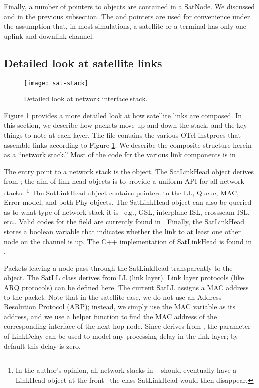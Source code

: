 Finally, a number of pointers to objects are contained in a SatNode.  We
discussed  and  in the previous 
subsection.  The  and  pointers are
used for convenience under the assumption that, in most simulations,
a satellite or a terminal has only one uplink and downlink channel.

\subsection{Detailed look at satellite links}
\begin{figure}
    \centerline{\texttt{[image: sat-stack]}}
    \caption{Detailed look at network interface stack.}
    \label{fig:sat-stack}
\end{figure}

Figure \ref{fig:sat-stack} provides a more detailed look at how satellite links
are composed.  In this section, we describe how packets move up and down
the stack, and the key things to note at each layer.  The file 
 contains the various OTcl instprocs that assemble
links according to Figure \ref{fig:sat-stack}.  We describe the composite
structure herein as a ``network stack.''  Most of the code for the
various link components is in .

The entry point to a network stack is the  object.  The
SatLinkHead object derives from ; the aim of link
head objects is to provide a uniform API for all network stacks.
\footnote{In the author's opinion, all network stacks in \ns~ should 
eventually have a LinkHead object at the front-- the class SatLinkHead 
would then disappear.}  The SatLinkHead object contains pointers to
the LL, Queue, MAC, Error model, and both Phy objects.  The SatLinkHead
object can also be queried as to what type of network stack it is-- e.g.,
GSL, interplane ISL, crossseam ISL, etc..  Valid codes for the  
field are currently found in .  Finally, the SatLinkHead
stores a boolean variable  that indicates whether
the link to at least one other node on the channel is up.  The C++
implementation of SatLinkHead is found in .

Packets leaving a node pass through the SatLinkHead transparently to the 
 object.  The SatLL class derives from LL (link layer).
Link layer protocols (like ARQ protocols) can be defined here.  The current
SatLL assigns a MAC address to the packet.  Note that in the satellite case,
we do not use an Address Resolution Protocol (ARP); instead, we simply use
the MAC  variable as its address, and we use a helper function
to find the MAC address of the corresponding interface of the next-hop node.  
Since  derives from , the 
parameter of LinkDelay can be used to model any processing delay in the
link layer; by default this delay is zero.

